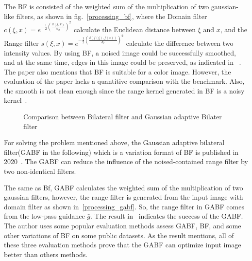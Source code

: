 \documentclass[12pt]{article}
\begin{document}
The BF is consisted of the weighted sum of the multiplication of two gaussian-like filters, as shown in fig.~\ref{processing_bf}, where the Domain filter $c(\xi, x) = e^{-\frac{1}{2}(\frac{d(\xi, x)}{\sigma_{d}})^2}$  calculate the Euclidean distance between $\xi$ and $x$, and the Range filter $s(\xi, x) = e^{-\frac{1}{2}(\frac{\delta(f(\xi), f(x))}{\sigma_{r}})^{2}}$ calculate the difference between two intensity values.
By using BF, a noised image could be successfully smoothed, and at the same time, edges in this image could be preserved, as indicated in ~\cite{paper_bf}. 
The paper also mentions that BF is suitable for a color image. 
However, the evaluation of the paper lacks a quantitive comparison with the benchmark.
Also, the smooth is not clean enough since the range kernel generated in BF is a noisy kernel~\cite{paper_gabf}.

\begin{figure}[H]
  \centering
  \quad
\caption{Comparison between Bilateral filter and Gaussian adaptive Bilater filter}
\label{processing}
\end{figure}

For solving the problem mentioned above, the Gaussian adaptive bilateral filter(GABF in the following) which is a variation format of BF  is published in 2020~\cite{paper_gabf}.
The GABF can reduce the influence of the noised-contained range filter by two non-identical filters. 

The same as Bf, GABF calculates the weighted sum of the multiplication of two gaussian filters, however, the range filter is generated from the input image with domain filter as shown in~\ref{processing_gabf}.
So, the range filter in GABF comes from the low-pass guidance $\bar{g}$.
The result in~\cite{paper_gabf} indicates the success of the GABF. 
The author uses some popular evaluation methods assess GABF, BF, and some other variations of BF on some public datasets. 
As the result mentions, all of these three evaluation methods prove that the GABF can optimize input image better than others methods.
\end{document}
